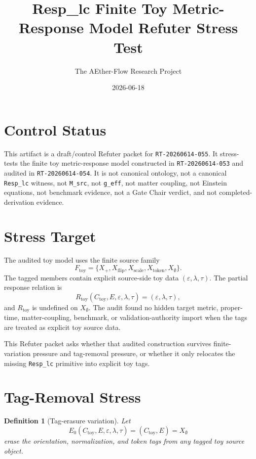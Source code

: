 \documentclass[11pt]{article}
\title{Resp\_lc Finite Toy Metric-Response Model Refuter Stress Test}
\author{The AEther-Flow Research Project}
\date{2026-06-18}
\newtheorem{definition}{Definition}
\begin{document}
\maketitle

\section*{Control Status}

This artifact is a draft/control Refuter packet for
\texttt{RT-20260614-055}. It stress-tests the finite toy
metric-response model constructed in \texttt{RT-20260614-053} and
audited in \texttt{RT-20260614-054}. It is not canonical ontology, not
a canonical \texttt{Resp\_lc} witness, not \texttt{M\_src}, not
\texttt{g\_eff}, not matter coupling, not Einstein equations, not
benchmark evidence, not a Gate Chair verdict, and not
completed-derivation evidence.

\section{Stress Target}

The audited toy model uses the finite source family
\[
F_{\mathrm{toy}}=\{X_+,X_{\mathrm{flip}},X_{\mathrm{scale}},
X_{\mathrm{token}},X_{\emptyset}\}.
\]
The tagged members contain explicit source-side toy data
\((\varepsilon,\lambda,\tau)\). The partial response relation is
\[
R_{\mathrm{toy}}(C_{\mathrm{toy}},E,\varepsilon,\lambda,\tau)
=(\varepsilon,\lambda,\tau),
\]
and \(R_{\mathrm{toy}}\) is undefined on \(X_{\emptyset}\). The audit
found no hidden target metric, proper-time, matter-coupling, benchmark,
or validation-authority import when the tags are treated as explicit
toy source data.

This Refuter packet asks whether that audited construction survives
finite-variation pressure and tag-removal pressure, or whether it only
relocates the missing \texttt{Resp\_lc} primitive into explicit toy
tags.

\section{Tag-Removal Stress}

\begin{definition}[Tag-erasure variation]
Let
\[
  E_0(C_{\mathrm{toy}},E,\varepsilon,\lambda,\tau)
  =(C_{\mathrm{toy}},E)=X_{\emptyset}
\]
erase the orientation, normalization, and token tags from any tagged
toy source object.
\end{definition}
\end{document}
